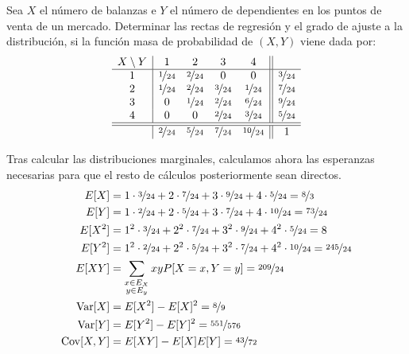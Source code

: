 \begin{ejercicio}
    Sea $X$ el número de balanzas e $Y$ el número de dependientes en los puntos de venta de un mercado. Determinar las rectas de regresión y el grado de ajuste a la distribución, si la función masa de probabilidad de $(X,Y)$ viene dada por:
    \begin{equation*}
        \begin{array}{c|cccc||c}
            X\setminus Y & 1 & 2 & 3 & 4\\
            \hline
            1 & \nicefrac{1}{24} & \nicefrac{2}{24} & 0 & 0 & \nicefrac{3}{24}\\
            2 & \nicefrac{1}{24} & \nicefrac{2}{24} & \nicefrac{3}{24} & \nicefrac{1}{24} & \nicefrac{7}{24}\\
            3 & 0 & \nicefrac{1}{24} & \nicefrac{2}{24} & \nicefrac{6}{24} & \nicefrac{9}{24}\\
            4 & 0 & 0 & \nicefrac{2}{24} & \nicefrac{3}{24} & \nicefrac{5}{24}\\
            \hline \hline
            & \nicefrac{2}{24} & \nicefrac{5}{24} & \nicefrac{7}{24} & \nicefrac{10}{24} & 1
        \end{array}
    \end{equation*}

    Tras calcular las distribuciones marginales, calculamos ahora las esperanzas necesarias para que el resto de cálculos posteriormente sean directos.
    \begin{align*}
        E[X] &= 1\cdot \nicefrac{3}{24} + 2\cdot \nicefrac{7}{24} + 3\cdot \nicefrac{9}{24} + 4\cdot \nicefrac{5}{24} = \nicefrac{8}{3}\\
        E[Y] &= 1\cdot \nicefrac{2}{24} + 2\cdot \nicefrac{5}{24} + 3\cdot \nicefrac{7}{24} + 4\cdot \nicefrac{10}{24} = \nicefrac{73}{24}\\
        E[X^2] &= 1^2\cdot \nicefrac{3}{24} + 2^2\cdot \nicefrac{7}{24} + 3^2\cdot \nicefrac{9}{24} + 4^2\cdot \nicefrac{5}{24} = 8\\
        E[Y^2] &= 1^2\cdot \nicefrac{2}{24} + 2^2\cdot \nicefrac{5}{24} + 3^2\cdot \nicefrac{7}{24} + 4^2\cdot \nicefrac{10}{24} = \nicefrac{245}{24}\\
        E[XY] &= \sum_{\substack{x\in E_X\\y\in E_y}}xyP[X = x, Y = y] = \nicefrac{209}{24}\\
        \operatorname{Var}[X] &= E[X^2] - E[X]^2 = \nicefrac{8}{9}\\
        \operatorname{Var}[Y] &= E[Y^2] - E[Y]^2 = \nicefrac{551}{576}\\
        \operatorname{Cov}[X,Y] &= E[XY] - E[X]E[Y] = \nicefrac{43}{72}
    \end{align*}


\end{ejercicio}
